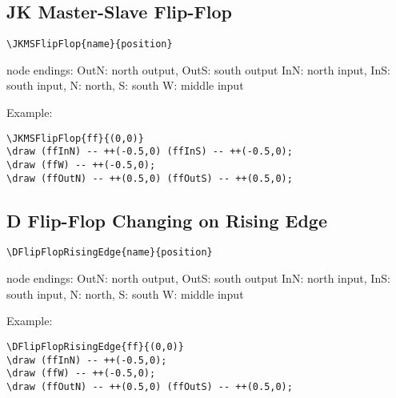 \documentclass[parskip=full]{scrartcl}
\begin{document}
\subsection{JK Master-Slave Flip-Flop}

\begin{verbatim}
\JKMSFlipFlop{name}{position}
\end{verbatim}
node endings: OutN: north output, OutS: south output
              InN: north input, InS: south input,
              N: north, S: south
              W: middle input

Example:\\
\begin{minipage}{0.8\textwidth}
\begin{verbatim}
\JKMSFlipFlop{ff}{(0,0)}
\draw (ffInN) -- ++(-0.5,0) (ffInS) -- ++(-0.5,0);
\draw (ffW) -- ++(-0.5,0);
\draw (ffOutN) -- ++(0.5,0) (ffOutS) -- ++(0.5,0);
\end{verbatim}
\end{minipage}
\begin{minipage}{0.19\textwidth}
\end{minipage}

\subsection{D Flip-Flop Changing on Rising Edge}

\begin{verbatim}
\DFlipFlopRisingEdge{name}{position}
\end{verbatim}
node endings: OutN: north output, OutS: south output
              InN: north input, InS: south input,
              N: north, S: south
              W: middle input

Example:\\
\begin{minipage}{0.8\textwidth}
\begin{verbatim}
\DFlipFlopRisingEdge{ff}{(0,0)}
\draw (ffInN) -- ++(-0.5,0);
\draw (ffW) -- ++(-0.5,0);
\draw (ffOutN) -- ++(0.5,0) (ffOutS) -- ++(0.5,0);
\end{verbatim}
\end{minipage}
\begin{minipage}{0.19\textwidth}
\end{minipage}
\end{document}

